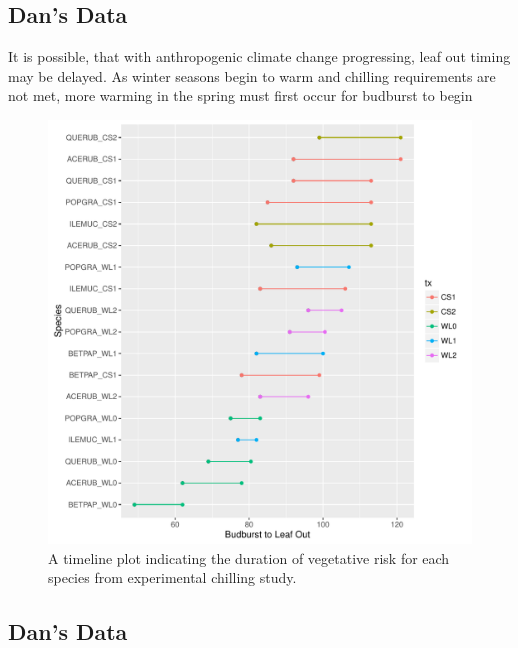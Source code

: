 \documentclass{article}\usepackage[]{graphicx}\usepackage[]{color}
\makeatletter
\def\maxwidth{ %
  \ifdim\Gin@nat@width>\linewidth
    \linewidth
  \else
    \Gin@nat@width
  \fi
}
\makeatother
\begin{document}
\subsection{Dan's Data}
It is possible, that with anthropogenic climate change progressing, leaf out timing may be delayed. As winter seasons begin to warm and chilling requirements are not met, more warming in the spring must first occur for budburst to begin \citep{Polgar2014, Fu2012, Morin2009, McCreary1990}

\begin{figure}[H]
\includegraphics[width=\maxwidth]{figure/chilling-1} \caption[A timeline plot indicating the duration of vegetative risk for each species from experimental chilling study]{A timeline plot indicating the duration of vegetative risk for each species from experimental chilling study.}\label{fig:chilling}
\end{figure}



\subsection{Dan's Data}
\end{document}
